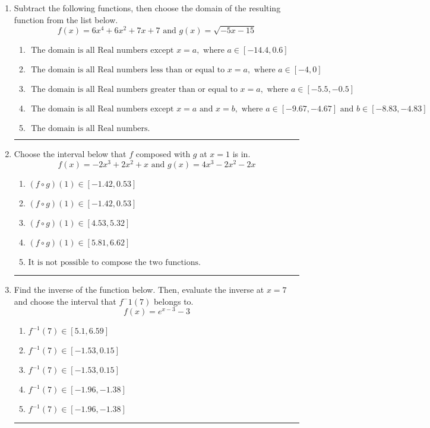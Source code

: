 \documentclass[14pt]{extbook}
\newcommand{\litem}[1]{\item#1\hspace*{-1cm}\rule{\textwidth}{0.4pt}}
\begin{document}
\begin{enumerate}
{\begin{enumerate}[label=\Alph*.]
\end{enumerate} }
\litem{
Subtract the following functions, then choose the domain of the resulting function from the list below.\[ f(x) = 6x^{4} +6 x^{2} +7 x + 7 \text{ and } g(x) = \sqrt{-5x-15}  \]\begin{enumerate}[label=\Alph*.]
\item \( \text{ The domain is all Real numbers except } x = a, \text{ where } a \in [-14.4, 0.6] \)
\item \( \text{ The domain is all Real numbers less than or equal to } x = a, \text{ where } a \in [-4, 0] \)
\item \( \text{ The domain is all Real numbers greater than or equal to } x = a, \text{ where } a \in [-5.5, -0.5] \)
\item \( \text{ The domain is all Real numbers except } x = a \text{ and } x = b, \text{ where } a \in [-9.67, -4.67] \text{ and } b \in [-8.83, -4.83] \)
\item \( \text{ The domain is all Real numbers. } \)

\end{enumerate} }
\litem{
Choose the interval below that $f$ composed with $g$ at $x=1$ is in.\[ f(x) = -2x^{3} +2 x^{2} +x \text{ and } g(x) = 4x^{3} -2 x^{2} -2 x \]\begin{enumerate}[label=\Alph*.]
\item \( (f \circ g)(1) \in [-1.42, 0.53] \)
\item \( (f \circ g)(1) \in [-1.42, 0.53] \)
\item \( (f \circ g)(1) \in [4.53, 5.32] \)
\item \( (f \circ g)(1) \in [5.81, 6.62] \)
\item \( \text{It is not possible to compose the two functions.} \)

\end{enumerate} }
\litem{
Find the inverse of the function below. Then, evaluate the inverse at $x = 7$ and choose the interval that $f^-1(7)$ belongs to.\[ f(x) = e^{x-3}-3 \]\begin{enumerate}[label=\Alph*.]
\item \( f^{-1}(7) \in [5.1, 6.59] \)
\item \( f^{-1}(7) \in [-1.53, 0.15] \)
\item \( f^{-1}(7) \in [-1.53, 0.15] \)
\item \( f^{-1}(7) \in [-1.96, -1.38] \)
\item \( f^{-1}(7) \in [-1.96, -1.38] \)


\end{enumerate}}
\end{enumerate}
\end{document}
